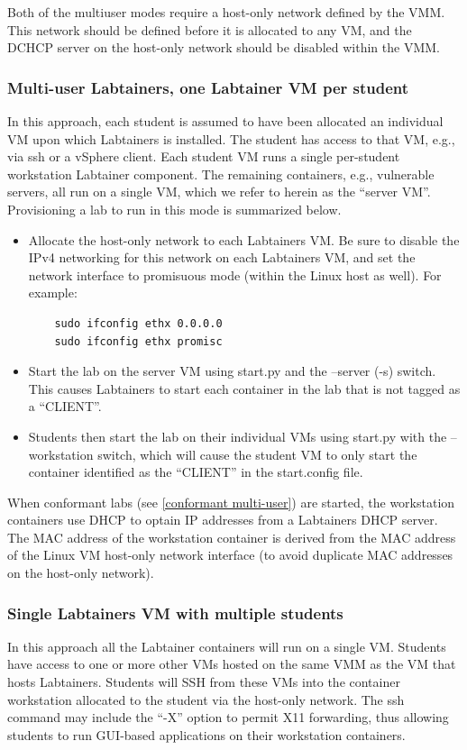\documentclass[12pt]{article}
\begin{document}
Both of the multiuser modes require a host-only network defined by the VMM.  This network should be defined
before it is allocated to any VM, and the DCHCP server on the host-only network should be disabled within 
the VMM.  

\subsubsection {Multi-user Labtainers, one Labtainer VM per student}
In this approach, each student is assumed to have been allocated an
individual VM upon which Labtainers is installed.
The student has access to that VM, e.g., via ssh or a vSphere client.  
Each student VM runs a single per-student workstation Labtainer component.
The remaining containers, e.g., vulnerable servers, all run on a single VM,
which we refer to herein as the ``server VM''.  Provisioning a lab to run
in this mode is summarized below.

\begin{itemize}
\item Allocate the host-only network to each Labtainers VM.  Be sure
to disable the IPv4 networking for this network on each Labtainers VM, and
set the network interface to promisuous mode (within the Linux host as well).
For example:
\begin{verbatim}
    sudo ifconfig ethx 0.0.0.0
    sudo ifconfig ethx promisc
\end{verbatim} 

\item Start the lab on the server VM using start.py and the --server (-s) switch. This
causes Labtainers to start each container in the lab that is not tagged as a ``CLIENT''. 

\item Students then
start the lab on their individual VMs using start.py with the --workstation switch, which will cause
the student VM to only start the container identified as the ``CLIENT'' in the start.config file.
\end{itemize}

When conformant labs (see \ref{conformant multi-user}) are started, the workstation containers 
use DHCP to optain IP addresses from a Labtainers DHCP server.  The MAC address of the workstation
container is derived from the MAC address of the Linux VM host-only network interface (to avoid
duplicate MAC addresses on the host-only network). 

\subsubsection {Single Labtainers VM with multiple students}
In this approach all the Labtainer containers will run on a single VM.  
Students have access to one or more other
VMs hosted on the same VMM as the VM that hosts Labtainers. Students will SSH from these VMs into the container workstation
allocated to the student via the host-only network.  The ssh command may include the ``-X'' option to permit X11 forwarding, thus allowing students to
run GUI-based applications on their workstation containers.
\end{document}
